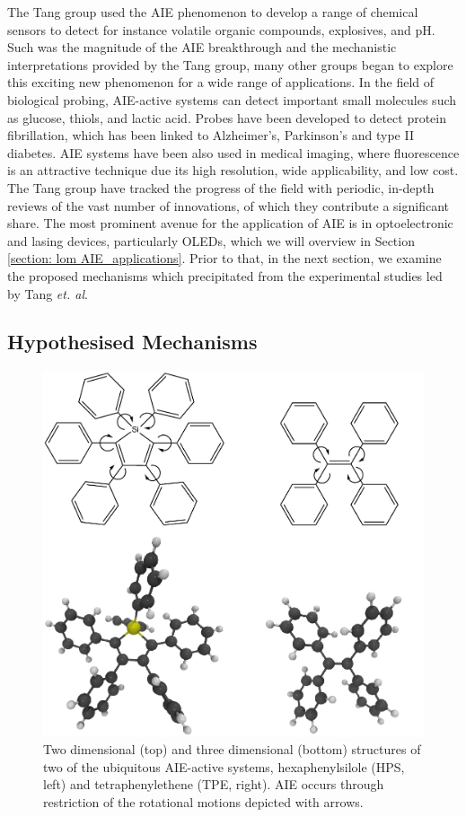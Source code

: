 The Tang group used the \ac{AIE} phenomenon to develop a range of chemical sensors to detect for instance volatile organic compounds, explosives, and pH.\cite{Dong2007,Li2005,Li2009} Such was the magnitude of the \ac{AIE} breakthrough and the mechanistic interpretations provided by the Tang group, many other groups began to explore this exciting new phenomenon for a wide range of applications. In the field of biological probing, \ac{AIE}-active systems can detect important small molecules such as glucose, thiols, and lactic acid.\cite{Wang2014,Yuan2014,Shen2012} Probes have been developed to detect protein fibrillation, which has been linked to Alzheimer's, Parkinson's and type II diabetes.\cite{Hong2012} \ac{AIE} systems have been also used in medical imaging, where fluorescence is an attractive technique due its high resolution, wide applicability, and low cost.\cite{Mei2015} The Tang group have tracked the progress of the field with periodic, in-depth reviews of the vast number of innovations, of which they contribute a significant share.\cite{Hong2009,Wang2010a,Hong2011,Mei2014,Hu2014,Mei2015} The most prominent avenue for the application of AIE is in optoelectronic and lasing devices, particularly OLEDs, which we will overview in Section \ref{section: lom AIE_applications}. Prior to that, in the next section,  we examine the proposed mechanisms which precipitated from the experimental studies led by Tang \textit{et. al}.

\subsection{Hypothesised Mechanisms}\label{section: lom AIE_mechanisms}

\begin{figure}[t]
\centering
  \includegraphics[width=0.7\linewidth]{1Intro/HPS_TPE.pdf}
  \caption[Examples of AIE-active chromophores]{Two dimensional (top) and three dimensional (bottom) structures of two of the ubiquitous AIE-active systems, hexaphenylsilole (HPS, left) and tetraphenylethene (\ac{TPE}, right). AIE occurs through restriction of the rotational motions depicted with arrows.}
  \label{figure: HPS_TPE}
\end{figure}

